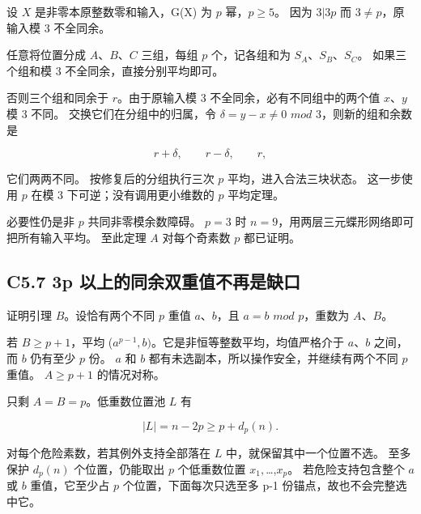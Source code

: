 \documentclass[11pt,a4paper]{article}
\theoremstyle{definition}
\numberwithin{equation}{section}
\begin{document}
{设} {\ensuremath{X}} {是非零本原整数零和输入，G(X)} {为} {\ensuremath{p}} {幂，\ensuremath{p\ge 5}。} {因为} {\ensuremath{3|3p}} {而} {\ensuremath{3\ne p}，原输入模} {3} {不全同余。}

{任意将位置分成} {\ensuremath{A}、\ensuremath{B}、\ensuremath{C}} {三组，每组} {\ensuremath{p}} {个，记各组和为} {\ensuremath{S_{A}}、\ensuremath{S_{B}}、\ensuremath{S_{C}}。} {如果三个组和模} {3} {不全同余，直接分别平均即可。}

{否则三个组和同余于} {\ensuremath{r}。由于原输入模} {3} {不全同余，必有不同组中的两个值} {\ensuremath{x}、\ensuremath{y}} {模} {3} {不同。} {交换它们在分组中的归属，令} {\ensuremath{\delta =y-x\ne 0}} {\ensuremath{mod}} {3，则新的组和余数是}

\[
r+\delta,\qquad r-\delta,\qquad r,
\]

{它们两两不同。} {按修复后的分组执行三次} {\ensuremath{p}} {平均，进入合法三块状态。} {这一步使用} {\ensuremath{p}} {在模} {3} {下可逆；没有调用更小维数的} {\ensuremath{p}} {平均定理。}

{必要性仍是非} {\ensuremath{p}} {共同非零模余数障碍。} {\ensuremath{p=3}} {时} {\ensuremath{n=9}，用两层三元蝶形网络即可把所有输入平均。} {至此定理} {\ensuremath{A}} {对每个奇素数} {\ensuremath{p}} {都已证明。}

\subsection*{\texorpdfstring{{C5.7} {3p} {以上的同余双重值不再是缺口}}{C5.7 3p 以上的同余双重值不再是缺口}}\label{C5-h33}

{证明引理} {\ensuremath{B}。设恰有两个不同} {\ensuremath{p}} {重值} {\ensuremath{a}、\ensuremath{b}，且} {\ensuremath{a=b}} {\ensuremath{mod}} {\ensuremath{p}，重数为} {\ensuremath{A}、\ensuremath{B}。}

{若} {\ensuremath{B\ge p+1}，平均} {(\ensuremath{a^{p-1},b)}。它是非恒等整数平均，均值严格介于} {\ensuremath{a}、\ensuremath{b}} {之间，而} {\ensuremath{b}} {仍有至少} {\ensuremath{p}} {份。} {\ensuremath{a}} {和} {\ensuremath{b}} {都有未选副本，所以操作安全，并继续有两个不同} {\ensuremath{p}} {重值。} {\ensuremath{A\ge p+1}} {的情况对称。}

{只剩} {\ensuremath{A=B=p}。低重数位置池} {\ensuremath{L}} {有}

\[
|L|=n-2p\ge p+d_p(n).
\]

{对每个危险素数，若其例外支持全部落在} {\ensuremath{L}} {中，就保留其中一个位置不选。} {至多保护} {\ensuremath{d_{p}(n)}} {个位置，仍能取出} {\ensuremath{p}} {个低重数位置} {\ensuremath{x_{1},}\ldots,\ensuremath{x_{p}}。} {若危险支持包含整个} {\ensuremath{a}} {或} {\ensuremath{b}} {重值，它至少占} {\ensuremath{p}} {个位置，下面每次只选至多} {p-1} {份锚点，故也不会完整选中它。}
\end{document}
